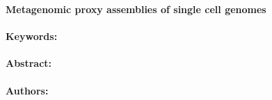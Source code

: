 \noindent
\large {\bf Metagenomic proxy assemblies of single cell genomes} 


\normalsize 


\noindent \paragraph{Keywords:} 

\noindent \paragraph{Abstract:} 



\noindent \paragraph{Authors:} 

